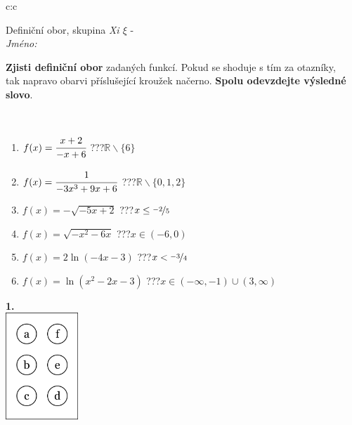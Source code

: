 \documentclass[10pt]{report}
\begin{document}
\begin{tabular}{c:c}
\begin{minipage}[c][104.5mm][t]{0.5\linewidth}
\begin{center}
\vspace{7mm}
{\huge Definiční obor, skupina \textit{Xi $\xi$} -}\\[5mm]
\textit{Jméno:}\phantom{xxxxxxxxxxxxxxxxxxxxxxxxxxxxxxxxxxxxxxxxxxxxxxxxxxxxxxxxxxxxxxxxx}\\[5mm]
\begin{minipage}{0.95\linewidth}
\begin{center}
\textbf{Zjisti definiční obor} zadaných funkcí. Pokud se shoduje s tím za otazníky,\\tak napravo obarvi příslušející kroužek načerno. \textbf{Spolu odevzdejte výsledné slovo}.
\end{center}
\end{minipage}
\\[1mm]
\begin{minipage}{0.79\linewidth}
\begin{center}
\begin{varwidth}{\linewidth}
\begin{enumerate}
\normalsizerrr
\item $f(x)=\cfrac{x+2}{-x+6}$\quad \dotfill\; ???\;\dotfill \quad $\mathbb{R}\smallsetminus\{6\}$
\item $f(x)=\cfrac{1}{-3x^3+9x+6}$\quad \dotfill\; ???\;\dotfill \quad $\mathbb{R}\smallsetminus\{0,1,2\}$
\item $f(x)=-\sqrt{-5x+2}$\quad \dotfill\; ???\;\dotfill \quad $x\leq\nicefrac{-2}{5}$
\item $f(x)=\sqrt{-x^2-6x}$\quad \dotfill\; ???\;\dotfill \quad $x\in(-6 , 0)$
\item $f(x)=2\ln{(-4x-3)}$\quad \dotfill\; ???\;\dotfill \quad $x<\nicefrac{-3}{4}$
\item $f(x)=\ln{(x^2-2x-3)}$\quad \dotfill\; ???\;\dotfill \quad $x\in(-\infty , -1)\cup(3 , \infty)$
\end{enumerate}
\end{varwidth}
\end{center}
\end{minipage}
\begin{minipage}{0.20\linewidth}
\begin{center}
{\Huge\bfseries 1.} \\[2mm]
\includegraphics[height=40mm]{../images/braille.png}

\end{center}
\end{minipage}
\end{center}
\end{minipage}
\end{tabular}
\end{document}
